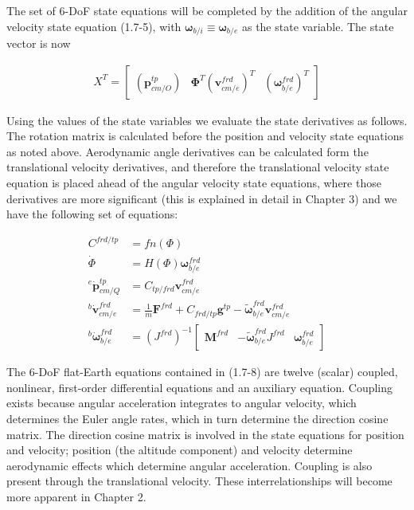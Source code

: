 The set of 6-DoF state equations will be completed by the addition of the angular velocity state equation (1.7-5), with \(\mathbf{\omega}_{b/i} \equiv \mathbf{\omega}_{b/e}\) as the state variable. The state vector is now

\begin{align*}\tag{1.7-17}
    X^{T} =
    \begin{bmatrix}
    \left( \mathbf{p}^{tp}_{cm/O} \right) &
    \mathbf{\Phi}^{T} {\left(\mathbf{v}^{frd}_{cm/e}\right)}^{T} &
    {\left(\mathbf{\omega}^{frd}_{b/e} \right)}^{T}
    \end{bmatrix}
\end{align*}

Using the values of the state variables we evaluate the state derivatives as follows. The rotation matrix is calculated before the position and velocity state equations as noted above. Aerodynamic angle derivatives can be calculated form the translational velocity derivatives, and therefore the translational velocity state equation is placed ahead of the angular velocity state equations, where those derivatives are more significant (this is explained in detail in Chapter 3) and we have the following set of equations:

\begin{align*}\tag{1.7-18}
    C^{frd/tp} &= fn \left( \Phi \right) \\
    \dot{\Phi} &=  H \left( \Phi \right) {\mathbf{\omega}^{frd}_{b/e}} \\
    {^{e}{\dot{\mathbf{p}}^{tp}_{cm/Q}}} &= {C_{tp/frd}}{\mathbf{v}^{frd}_{cm/e}} \\
    {^{b}{\dot{\mathbf{v}}^{frd}_{cm/e}}} &= \textstyle{\frac{1}{m}} {\mathbf{F}^{frd}} + {C_{frd/tp}}{\mathbf{g}^{tp}} - {\tilde{\mathbf{\omega}}^{frd}_{b/e}} {\mathbf{v}^{frd}_{cm/e}} \\
    { ^{b}{\dot{\mathbf{\omega}}^{frd}_{b/e}}} &= {\left( J^{frd} \right)}^{-1}
    \begin{bmatrix}
        \mathbf{M}^{frd} & -{\tilde{\mathbf{\omega}}^{frd}_{b/e}} {J^{frd}} & {\mathbf{\omega}^{frd}_{b/e}}
    \end{bmatrix}
\end{align*}

The 6-DoF flat-Earth equations contained in (1.7-8) are twelve (scalar) coupled, nonlinear, first-order differential equations and an auxiliary equation. Coupling exists because angular acceleration integrates to angular velocity, which determines the Euler angle rates, which in turn determine the direction cosine matrix. The direction cosine matrix is involved in the state equations for position and velocity; position (the altitude component) and velocity determine aerodynamic effects which determine angular acceleration. Coupling is also present through the translational velocity. These interrelationships will become more apparent in Chapter 2.

